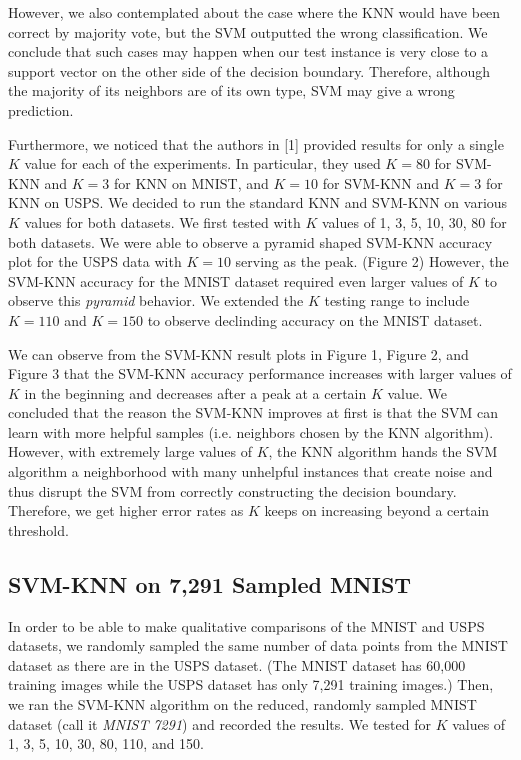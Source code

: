 \documentclass[11pt,letterpaper]{article}
\begin{document}
However, we also contemplated about the case where the KNN would have been correct by majority vote, but the SVM outputted the wrong classification. We conclude that such cases may happen when our test instance is very close to a support vector on the other side of the decision boundary. Therefore, although the majority of its neighbors are of its own type, SVM may give a wrong prediction.

Furthermore, we noticed that the authors in [1] provided results for only a single $K$ value for each of the experiments. In particular, they used $K=80$ for SVM-KNN and $K=3$ for KNN on MNIST,  and $K=10$ for SVM-KNN and $K=3$ for KNN on USPS. We decided to run the standard KNN and SVM-KNN on various $K$ values for both datasets. We first tested with $K$ values of 1, 3, 5, 10, 30, 80 for both datasets. We were able to observe a pyramid shaped SVM-KNN accuracy plot for the USPS data with $K=10$ serving as the peak. (Figure 2) However, the SVM-KNN accuracy for the MNIST dataset required even larger values of $K$ to observe this \textit{pyramid} behavior. We extended the $K$ testing range to include $K=110$ and $K=150$ to observe declinding accuracy on the MNIST dataset.

We can observe from the SVM-KNN result plots in Figure 1, Figure 2, and Figure 3 that the SVM-KNN accuracy performance increases with larger values of $K$ in the beginning and decreases after a peak at a certain $K$ value. We concluded that the reason the SVM-KNN improves at first is that the SVM can learn with more helpful samples (i.e. neighbors chosen by the KNN algorithm). However, with extremely large values of $K$, the KNN algorithm hands the SVM algorithm a neighborhood with many unhelpful instances that create noise and thus disrupt the SVM from correctly constructing the decision boundary. Therefore, we get higher error rates as $K$ keeps on increasing beyond a certain threshold.
 
\subsection{SVM-KNN on 7,291 Sampled MNIST}

In order to be able to make qualitative comparisons of the MNIST and USPS datasets, we randomly sampled the same number of data points from the MNIST dataset as there are in the USPS dataset. (The MNIST dataset has 60,000 training images while the USPS dataset has only 7,291 training images.) Then, we ran the SVM-KNN algorithm on the reduced, randomly sampled MNIST dataset (call it \textit{MNIST 7291}) and recorded the results. We tested for $K$ values of 1, 3, 5, 10, 30, 80, 110, and 150.
\end{document}

